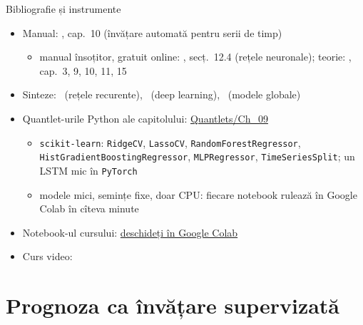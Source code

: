 \begin{frame}{Bibliografie și instrumente}
\itemsize{\small}
\begin{itemize}
    \item Manual: , cap.~10 (învățare automată pentru serii de timp)
    \begin{itemize}
        \item manual însoțitor, gratuit online: , secț.~12.4 (rețele neuronale); teorie: , cap.~3, 9, 10, 11, 15
    \end{itemize}
    \item Sinteze: \ (rețele recurente), \ (deep learning), \ (modele globale)
    \item Quantlet-urile Python ale capitolului: \href{https://github.com/danpele/Time-Series-Analysis/tree/main/Quantlets/Ch_09}{Quantlets/Ch\_09}
    \begin{itemize}
        \item \texttt{scikit-learn}: \texttt{RidgeCV}, \texttt{LassoCV}, \texttt{RandomForestRegressor}, \texttt{HistGradientBoostingRegressor}, \texttt{MLPRegressor}, \texttt{TimeSeriesSplit}; un LSTM mic în \texttt{PyTorch}
        \item modele mici, semințe fixe, doar CPU: fiecare notebook rulează în Google Colab în cîteva minute
    \end{itemize}
    \item Notebook-ul cursului: \href{\colaburl{notebooks/EN/chapter9_lecture_notebook.ipynb}}{deschideți în Google Colab}
    \item Curs video: 
\end{itemize}
\end{frame}


\section{Prognoza ca învățare supervizată}

